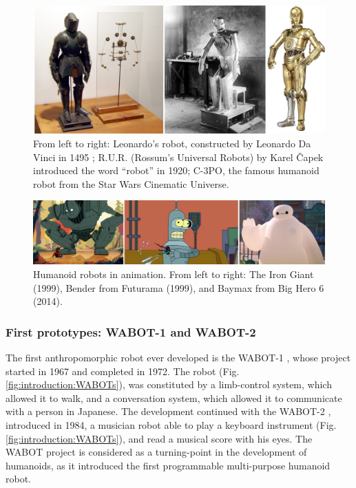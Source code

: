 \begin{figure}
    \centering
    \includegraphics[width=\textwidth]{figures/01-introduction/robot-history.jpg}
    \caption{From left to right: Leonardo's robot, constructed by Leonardo Da
        Vinci in 1495 \cite{Moran2006TheDaVinciRobot};
        R.U.R. (Rossum's Universal Robots) by Karel {\v C}apek introduced 
        the word ``robot'' in 1920;
        C-3PO, the famous humanoid robot from the Star Wars Cinematic Universe.
    }
    \label{fig:introduction:robots-in-history}
\end{figure}

\begin{figure}
    \centering
    \includegraphics[width=\textwidth]{figures/01-introduction/robots-in-animation.jpg}
    \caption{Humanoid robots in animation. From left to right:
        The Iron Giant (1999),
        Bender from Futurama (1999), and
        Baymax from Big Hero 6 (2014).
    }
    \label{fig:introduction:robots-in-animation}
\end{figure}

\subsubsection{First prototypes: WABOT-1 and WABOT-2}
The first anthropomorphic robot ever developed is the WABOT-1
\cite{Kato1973TheWABOT1}, whose project started in 1967 and completed in 1972.
The robot (Fig. \ref{fig:introduction:WABOTs}), was constituted by a limb-control
system, which allowed it to walk, and a conversation system, 
which allowed it to communicate with a person in Japanese. The development 
continued with the WABOT-2 \cite{Kato1987WABOT2}, introduced in 1984,
a musician robot able to play a keyboard instrument (Fig.
\ref{fig:introduction:WABOTs}), and read a musical score with his eyes. The WABOT
project is considered as a turning-point in the development of humanoids, as it 
introduced the first programmable multi-purpose humanoid robot.

